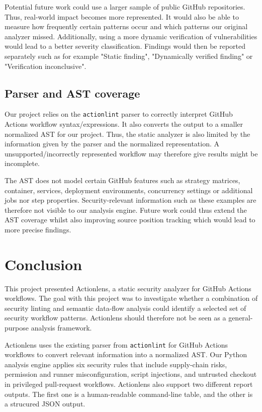 \documentclass{article}
\begin{document}
Potential future work could use a larger sample of public GitHub repositories. Thus, real-world impact becomes more represented. It would also be able to measure how frequently certain patterns occur and which patterns our original analyzer missed. Additionally, using a more dynamic verification of vulnerabilities would lead to a better severity classification. Findings would then be reported separately such as for example "Static finding", "Dynamically verified finding" or "Verification inconclusive". 

\subsection{Parser and AST coverage}

Our project relies on the \texttt{actionlint} parser to correctly interpret GitHub Actions workflow syntax/expressions. It also converts the output to a smaller normalized AST for our project. Thus, the static analyzer is also limited by the information given by the parser and the normalized representation. A unsupported/incorrectly represented workflow may therefore give results might be incomplete. 

The AST does not model certain GitHub features such as strategy matrices, container, services, deployment environments, concurrency settings or additional jobs nor step properties. Security-relevant information such as these examples are therefore not visible to our analysis engine. Future work could thus extend the AST coverage whilst also improving source position tracking which would lead to more precise findings.

\section{Conclusion}

This project presented Actionlens, a static security analyzer for GitHub Actions workflows. The goal with this project was to investigate whether a combination of security linting and semantic data-flow analysis could identify a selected set of security workflow patterns. Actionlens should therefore not be seen as a general-purpose analysis framework.

Actionlens uses the existing parser from \texttt{actionlint} for GitHub Actions workflows to convert relevant information into a normalized AST. Our Python analysis engine applies six security rules that include supply-chain risks, permission and runner misconfiguration, script injections, and untrusted checkout in privileged pull-request workflows. Actionlens also support two different report outputs. The first one is a human-readable command-line table, and the other is a strucured JSON output. 
\end{document}
